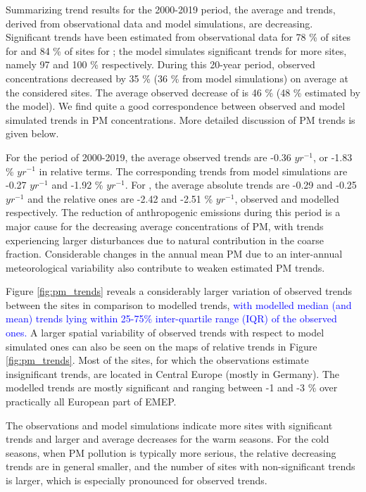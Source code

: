 Summarizing trend results for the 2000-2019 period, the average \PM[10] and \PM[2.5] trends, derived from observational data and model simulations, are decreasing. Significant trends have been estimated from observational data for 78 \% of sites for \PM[10] and 84 \% of sites for \PM[2.5]; the model simulates significant trends for more sites, namely 97 and 100 \% respectively. During this 20-year period, observed \PM[10] concentrations decreased by 35 \%  (36 \% from model simulations) on average at the considered sites. The average observed decrease of \PM[2.5] is 46 \%  (48 \% estimated by the model). We find quite a good correspondence between observed and model simulated trends in PM concentrations. More detailed discussion of PM trends is given below.

For the period of 2000-2019, the average observed \PM[10] trends are -0.36 \ug $yr^{-1}$, or -1.83 \% $yr^{-1}$ in relative terms. The corresponding \PM[10] trends from model simulations are -0.27 \ug $yr^{-1}$ and -1.92 \% $yr^{-1}$. For \PM[2.5], the average absolute trends are -0.29 and -0.25 \ug $yr^{-1}$ and the relative ones are -2.42 and -2.51 \% $yr^{-1}$, observed and modelled respectively. The reduction of anthropogenic emissions during this period is a major cause for the decreasing average concentrations of PM, with \PM[10] trends experiencing larger disturbances due to natural contribution in the coarse fraction. Considerable changes in the annual mean PM due to an inter-annual meteorological variability also contribute to weaken estimated PM trends.

Figure \ref{fig:pm_trends} reveals a considerably larger variation of observed trends between the sites in comparison to modelled trends, \textcolor{blue}{with modelled median (and mean) trends lying within 25-75\% inter-quartile range (IQR) of the observed ones.} A larger spatial variability of observed trends with respect to model simulated ones can also be seen on the maps of relative trends in Figure \ref{fig:pm_trends}. Most of the sites, for which the observations estimate insignificant trends, are located in Central Europe (mostly in Germany). The modelled trends are mostly significant and ranging between -1 and -3 \% over practically all European part of EMEP.


The observations and model simulations indicate more sites with significant trends and larger \PM[10] and \PM[2.5] average decreases for the warm seasons. For the cold seasons, when PM pollution is typically more serious, the relative decreasing trends are in general smaller, and the number of sites with non-significant trends is larger, which is especially pronounced for observed \PM[10] trends.

